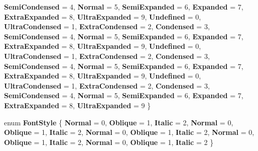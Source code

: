 \begin{DoxyCompactItemize}
{\bfseries Semi\+Condensed} = 4, 
{\bfseries Normal} = 5, 
\newline
{\bfseries Semi\+Expanded} = 6, 
{\bfseries Expanded} = 7, 
{\bfseries Extra\+Expanded} = 8, 
{\bfseries Ultra\+Expanded} = 9, 
\newline
{\bfseries Undefined} = 0, 
{\bfseries Ultra\+Condensed} = 1, 
{\bfseries Extra\+Condensed} = 2, 
{\bfseries Condensed} = 3, 
\newline
{\bfseries Semi\+Condensed} = 4, 
{\bfseries Normal} = 5, 
{\bfseries Semi\+Expanded} = 6, 
{\bfseries Expanded} = 7, 
\newline
{\bfseries Extra\+Expanded} = 8, 
{\bfseries Ultra\+Expanded} = 9, 
{\bfseries Undefined} = 0, 
{\bfseries Ultra\+Condensed} = 1, 
\newline
{\bfseries Extra\+Condensed} = 2, 
{\bfseries Condensed} = 3, 
{\bfseries Semi\+Condensed} = 4, 
{\bfseries Normal} = 5, 
\newline
{\bfseries Semi\+Expanded} = 6, 
{\bfseries Expanded} = 7, 
{\bfseries Extra\+Expanded} = 8, 
{\bfseries Ultra\+Expanded} = 9, 
\newline
{\bfseries Undefined} = 0, 
{\bfseries Ultra\+Condensed} = 1, 
{\bfseries Extra\+Condensed} = 2, 
{\bfseries Condensed} = 3, 
\newline
{\bfseries Semi\+Condensed} = 4, 
{\bfseries Normal} = 5, 
{\bfseries Semi\+Expanded} = 6, 
{\bfseries Expanded} = 7, 
\newline
{\bfseries Extra\+Expanded} = 8, 
{\bfseries Ultra\+Expanded} = 9
 \}
\item 
\mbox{\label{namespace_windows_1_1_u_i_1_1_text_a60a89aee1a9831c91a4aabca7103b5e8}} 
enum {\bfseries Font\+Style} \{ \newline
{\bfseries Normal} = 0, 
{\bfseries Oblique} = 1, 
{\bfseries Italic} = 2, 
{\bfseries Normal} = 0, 
\newline
{\bfseries Oblique} = 1, 
{\bfseries Italic} = 2, 
{\bfseries Normal} = 0, 
{\bfseries Oblique} = 1, 
\newline
{\bfseries Italic} = 2, 
{\bfseries Normal} = 0, 
{\bfseries Oblique} = 1, 
{\bfseries Italic} = 2, 
\newline
{\bfseries Normal} = 0, 
{\bfseries Oblique} = 1, 
{\bfseries Italic} = 2
 \}
\item 
\mbox{\label{namespace_windows_1_1_u_i_1_1_text_a5d8427c75e3dbef5872b8609b90b88e2}} 

\end{DoxyCompactItemize}
